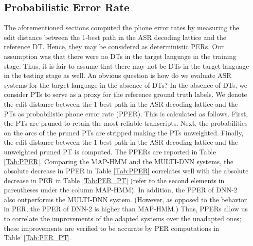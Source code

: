\documentclass[a4paper]{article}
\begin{document}
\vspace{-1mm}
\subsection{Probabilistic Error Rate} \vspace{-1mm}
\label{sec:Probabilistic Error Rate}
The aforementioned sections computed the phone error rates by measuring the edit distance between the 1-best path in the ASR decoding lattice and the reference DT. Hence, they may be considered as deterministic PERs. Our assumption was that there were no DTs in the target language in the training stage. Thus, it is fair to assume that there may not be DTs in the target language in the testing stage as well. An obvious question is how do we evaluate ASR systems for the target language in the absence of DTs? In the absence of DTs, we consider PTs to serve as a proxy for the reference ground truth labels. We denote the edit distance between the 1-best path in the ASR decoding lattice and the PTs as probabilistic phone error rate (PPER).
This is calculated as follows. First, the PTs are pruned to retain the most reliable transcripts. Next, the probabilities on the arcs of the pruned PTs are stripped making the PTs unweighted. Finally, the edit distance between the 1-best path in the ASR decoding lattice and the unweighted pruned PT is computed. The PPERs are reported in Table \ref{Tab:PPER}. Comparing the MAP-HMM and the MULTI-DNN systems, the absolute decrease in PPER in Table \ref{Tab:PPER} correlates well with the absolute decrease in PER in Table \ref{Tab:PER_PT} (refer to the second elements in parentheses under the column MAP-HMM). In addition, the PPER of DNN-2 also outperforms the MULTI-DNN system. (However, as opposed to the behavior in PER, the PPER of DNN-2 is higher than MAP-HMM.) Thus, PPERs allow us to correlate the improvements of the adapted systems over the unadapted ones; these improvements are verified to be accurate by PER computations in Table~\ref{Tab:PER_PT}.

\end{document}
